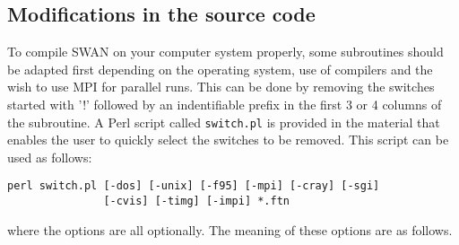 \documentclass[12pt]{book}
\begin{document}
\subsection{Modifications in the source code}

To compile SWAN on your computer system properly, some subroutines should be adapted first
depending on the operating system, use of compilers and the wish to use MPI for
parallel runs. This can be done by removing the switches started with '!' followed by an
indentifiable prefix in the first 3 or 4 columns of the subroutine. A Perl script called
{\tt switch.pl} is provided in the material that enables the user to quickly select the
switches to be removed. This script can be used as follows:
\begin{verbatim}
perl switch.pl [-dos] [-unix] [-f95] [-mpi] [-cray] [-sgi]
               [-cvis] [-timg] [-impi] *.ftn
\end{verbatim}
where the options are all optionally. The meaning of these options are as follows.
\end{document}
